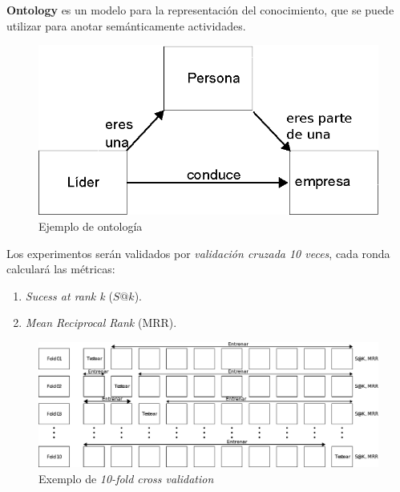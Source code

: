 \begin{frame}
	\begin{block}{}
		\textbf{Ontology} es un modelo para la representación del conocimiento, que se puede utilizar para anotar semánticamente actividades.
		
		\begin{figure}
			\begin{minipage}[b]{0.7\textwidth}
				\includegraphics[width=\textwidth]{./secoes/ConceitosFundamentais/Ontologia.eps}
				\caption{Ejemplo de ontología}
			\end{minipage}
		\end{figure}
	\end{block}
\end{frame}

\begin{frame}
	\begin{block}{}
		Los experimentos serán validados por \emph{validación cruzada 10 veces}, cada ronda calculará las métricas:
		\begin{enumerate}
			\item \emph{Sucess at rank k} (\(S@k\)).
			\item \emph{Mean Reciprocal Rank} (MRR).		
		\end{enumerate}
		
		\begin{figure}
			\begin{minipage}[b]{0.9\textwidth}
				\includegraphics[width=\textwidth]{./secoes/ConceitosFundamentais/10FOLDCROSS.eps}
				\caption{Exemplo de \emph{10-fold cross validation}}
			\end{minipage}
		\end{figure}
		
	\end{block}
\end{frame}

